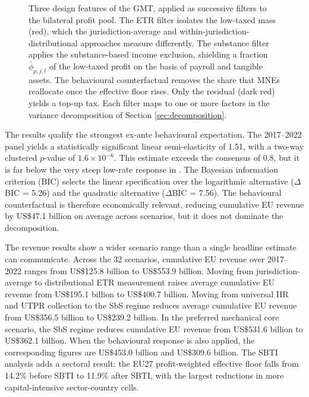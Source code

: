 \documentclass[11pt,a4paper]{article}
\begin{document}
\begin{figure}[H]
{
}
\caption[GMT design features as successive filters.]{Three design features of the GMT, applied as successive filters to the bilateral profit pool. The ETR filter isolates the low-taxed mass (red), which the jurisdiction-average and within-jurisdiction-distributional approaches measure differently. The substance filter applies the substance-based income exclusion, shielding a fraction $\bar{\phi}_{p,j,t}$ of the low-taxed profit on the basis of payroll and tangible assets. The behavioural counterfactual removes the share that MNEs reallocate once the effective floor rises. Only the residual (dark red) yields a top-up tax. Each filter maps to one or more factors in the variance decomposition of Section \ref{sec:decomposition}.}
\label{fig:gmt_mechanics_intro}
\end{figure}

The results qualify the strongest ex-ante behavioural expectation. The 2017--2022 panel yields a statistically significant linear semi-elasticity of 1.51, with a two-way clustered $p$-value of $1.6 \times 10^{-6}$. This estimate exceeds the \citet{heckemeyer2017} consensus of 0.8, but it is far below the very steep low-rate response in \citet{dowd2017}. The Bayesian information criterion (BIC) selects the linear specification over the logarithmic alternative ($\Delta$BIC = 5.26) and the quadratic alternative ($\Delta$BIC = 7.56). The behavioural counterfactual is therefore economically relevant, reducing cumulative EU revenue by US\$47.1 billion on average across scenarios, but it does not dominate the decomposition.

The revenue results show a wider scenario range than a single headline estimate can communicate. Across the 32 scenarios, cumulative EU revenue over 2017--2022 ranges from US\$125.8 billion to US\$553.9 billion. Moving from jurisdiction-average to distributional ETR measurement raises average cumulative EU revenue from US\$195.1 billion to US\$400.7 billion. Moving from universal IIR and UTPR collection to the SbS regime reduces average cumulative EU revenue from US\$356.5 billion to US\$239.2 billion. In the preferred mechanical core scenario, the SbS regime reduces cumulative EU revenue from US\$531.6 billion to US\$362.1 billion. When the behavioural response is also applied, the corresponding figures are US\$453.0 billion and US\$309.6 billion. The SBTI analysis adds a sectoral result: the EU27 profit-weighted effective floor falls from 14.2\% before SBTI to 11.9\% after SBTI, with the largest reductions in more capital-intensive sector-country cells.
\end{document}
